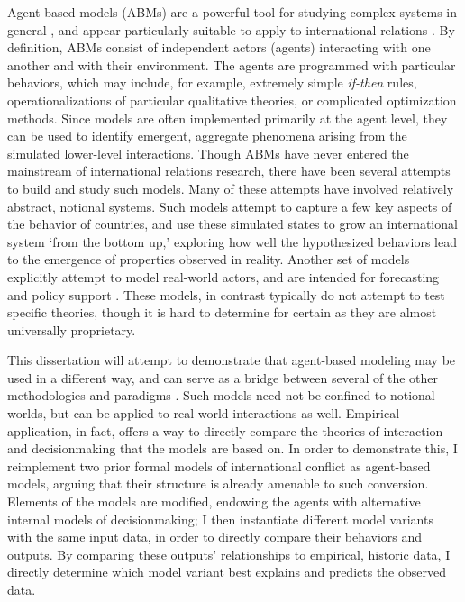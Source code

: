 Agent-based models (ABMs) are a powerful tool for studying complex systems in general \citep{miller_2007}, and appear particularly suitable to apply to international relations \citep{cederman_1997}. By definition, ABMs consist of independent actors (agents) interacting with one another and with their environment. The agents are programmed with particular behaviors, which may include, for example, extremely simple \emph{if-then} rules, operationalizations of particular qualitative theories, or complicated optimization methods. Since models are often implemented primarily at the agent level, they can be used to identify emergent, aggregate phenomena arising from the simulated lower-level interactions. Though ABMs have never entered the mainstream of international relations research, there have been several attempts to build and study such models. Many of these attempts \citep[e.g.][]{axelrod_1997,cederman_1997,min_2002} have involved relatively abstract, notional systems. Such models attempt to capture a few key aspects of the behavior of countries, and use these simulated states to grow an international system `from the bottom up,' exploring how well the hypothesized behaviors lead to the emergence of properties observed in reality. Another set of models explicitly attempt to model real-world actors, and are intended for forecasting and policy support \citep[e.g.][]{taylor_2008,abdollahian_2006}. These models, in contrast typically do not attempt to test specific theories, though it is hard to determine for certain as they are almost universally proprietary.

This dissertation will attempt to demonstrate that agent-based modeling may be used in a different way, and can serve as a bridge between several of the other methodologies and paradigms \citep{axelrod_2006}. Such models need not be confined to notional worlds, but can be applied to real-world interactions as well. Empirical application, in fact, offers a way to directly compare the theories of interaction and decisionmaking that the models are based on. In order to demonstrate this, I reimplement two prior formal models of international conflict as agent-based models, arguing that their structure is already amenable to such conversion. Elements of the models are modified, endowing the agents with alternative internal models of decisionmaking; I then instantiate different model variants with the same input data, in order to directly compare their behaviors and outputs. By comparing these outputs' relationships to empirical, historic data, I directly determine which model variant best explains and predicts the observed data.

